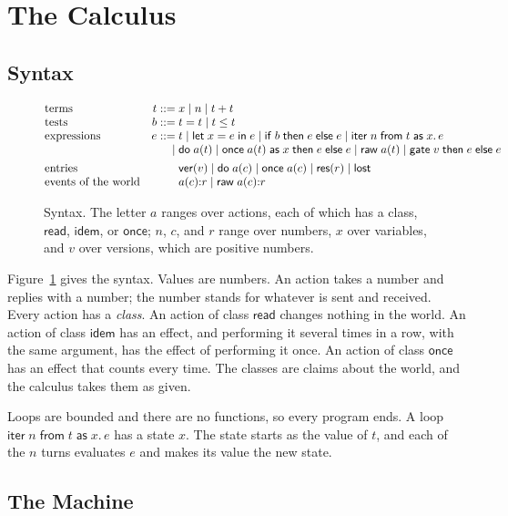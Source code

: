 \documentclass[acmsmall,nonacm,screen]{acmart}
\newcommand{\kw}[1]{\mathsf{#1}}
\newcommand{\letin}[3]{\kw{let}\;#1 = #2\;\kw{in}\;#3}
\newcommand{\ite}[3]{\kw{if}\;#1\;\kw{then}\;#2\;\kw{else}\;#3}
\newcommand{\once}[5]{\kw{once}\;#1(#2)\;\kw{as}\;#3\;\kw{then}\;#4\;\kw{else}\;#5}
\newcommand{\gate}[3]{\kw{gate}\;#1\;\kw{then}\;#2\;\kw{else}\;#3}
\newcommand{\iter}[4]{\kw{iter}\;#1\;\kw{from}\;#2\;\kw{as}\;#3.\,#4}
\newcommand{\res}[1]{\kw{res}(#1)}
\newcommand{\lost}{\kw{lost}}
\newcommand{\ver}[1]{\kw{ver}(#1)}
\newcommand{\rd}{\kw{read}}
\newcommand{\idem}{\kw{idem}}
\newcommand{\onceclass}{\kw{once}}
\begin{document}
\section{The Calculus}
\label{sec:calculus}

\subsection{Syntax}

\begin{figure}[t]
\[
\begin{array}{@{}l@{\quad}r@{\;}l@{}}
\text{terms} & t ::= & x \mid n \mid t + t \\
\text{tests} & b ::= & t = t \mid t \le t \\
\text{expressions} & e ::= & t \mid \letin{x}{e}{e} \mid \ite{b}{e}{e} \mid \iter{n}{t}{x}{e} \\
 & \mid & \kw{do}\;a(t) \mid \once{a}{t}{x}{e}{e} \mid \kw{raw}\;a(t) \mid \gate{v}{e}{e} \\[1ex]
\text{entries} & & \ver{v} \mid \kw{do}\;a(c) \mid \kw{once}\;a(c) \mid \res{r} \mid \lost \\
\text{events of the world} & & a(c){:}r \mid \kw{raw}\;a(c){:}r
\end{array}
\]
\caption{Syntax. The letter $a$ ranges over actions, each of which has a class, $\rd$,
$\idem$, or $\onceclass$; $n$, $c$, and $r$ range over numbers, $x$ over variables, and $v$
over versions, which are positive numbers.}
\label{fig:syntax}
\end{figure}

Figure~\ref{fig:syntax} gives the syntax. Values are numbers. An action takes a number and
replies with a number; the number stands for whatever is sent and received. Every action has a
\emph{class}. An action of class $\rd$ changes nothing in the world. An action of class
$\idem$ has an effect, and performing it several times in a row, with the same argument, has
the effect of performing it once. An action of class $\onceclass$ has an effect that counts
every time. The classes are claims about the world, and the calculus takes them as given.

Loops are bounded and there are no functions, so every program ends. A loop
$\iter{n}{t}{x}{e}$ has a state $x$. The state starts as the value of $t$, and each of the $n$
turns evaluates $e$ and makes its value the new state.

\subsection{The Machine}
\label{sec:machine}
\end{document}
